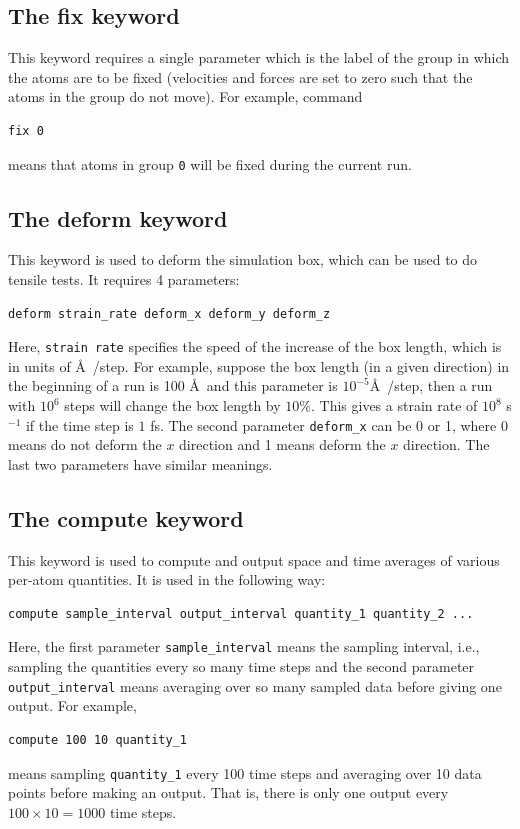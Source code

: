 \documentclass[12pt,a4paper]{report}
\begin{document}
\subsection{The fix keyword}

This keyword requires a single parameter which is the label of the group in which the atoms are to be fixed (velocities and forces are set to zero such that the atoms in the group do not move). For example, command
\begin{verbatim}
fix 0
\end{verbatim}
means that atoms in group \verb"0" will be fixed during the current run.


\subsection{The deform keyword}

This keyword is used to deform the simulation box, which can be used to do tensile tests. It requires 4 parameters:
\begin{verbatim}
deform strain_rate deform_x deform_y deform_z
\end{verbatim}
Here, \verb"strain rate" specifies the speed of the increase of the box length, which is in units of \AA~/step. For example, suppose the box length (in a given direction) in the beginning of a run is 100 \AA~and this parameter is $10^{-5}$\AA~/step, then a run with $10^6$ steps will change the box length by $10\%$. This gives a strain rate of $10^8$ s$^{-1}$ if the time step is $1$ fs. The second parameter \verb"deform_x" can be 0 or 1, where 0 means do not deform the $x$ direction and 1 means deform the $x$ direction. The last two parameters have similar meanings. 


\subsection{The compute keyword}

This keyword is used to compute and output space and time averages of various per-atom quantities. It is used in the following way:
\begin{verbatim}
compute sample_interval output_interval quantity_1 quantity_2 ...
\end{verbatim}
Here, the first parameter \verb"sample_interval" means the sampling interval, i.e., sampling the quantities every so many time steps and the second parameter \verb"output_interval" means averaging over so many sampled data before giving one output. For example, 
\begin{verbatim}
compute 100 10 quantity_1
\end{verbatim}
means sampling \verb"quantity_1" every 100 time steps and averaging over 10 data points before making an output. That is, there is only one output every $100 \times 10=1000$ time steps. 
\end{document}
